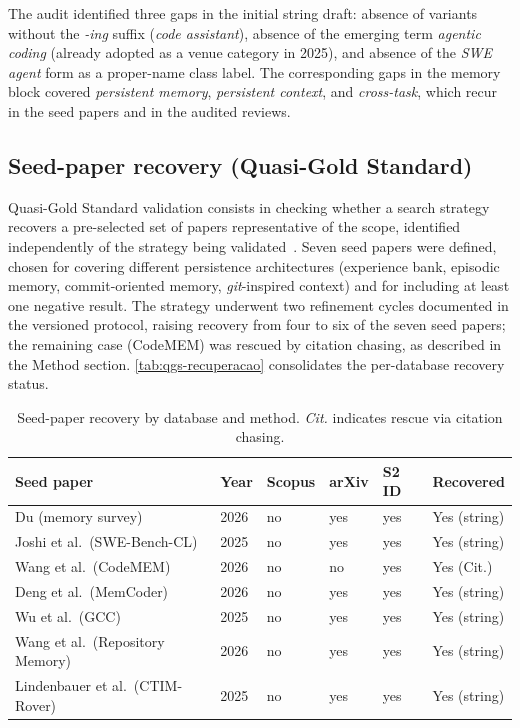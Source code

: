 The audit identified three gaps in the initial string draft: absence of variants without the
\textit{-ing} suffix (\textit{code assistant}), absence of the emerging term \textit{agentic
coding} (already adopted as a venue category in 2025), and absence of the \textit{SWE agent}
form as a proper-name class label.
The corresponding gaps in the memory block covered \textit{persistent memory},
\textit{persistent context}, and \textit{cross-task}, which recur in the seed papers and in
the audited reviews.

\subsection{Seed-paper recovery (Quasi-Gold Standard)}
\label{ap:qgs}

Quasi-Gold Standard validation consists in checking whether a search strategy recovers a
pre-selected set of papers representative of the scope, identified independently of the
strategy being validated~\citep{mourao2020hybrid}.
Seven seed papers were defined, chosen for covering different persistence architectures
(experience bank, episodic memory, commit-oriented memory, \textit{git}-inspired context)
and for including at least one negative result.
The strategy underwent two refinement cycles documented in the versioned protocol, raising
recovery from four to six of the seven seed papers; the remaining case (CodeMEM) was
rescued by citation chasing, as described in the Method section.
\autoref{tab:qgs-recuperacao} consolidates the per-database recovery status.

\begin{table}[htbp]
\centering
\caption{Seed-paper recovery by database and method. \textit{Cit.} indicates rescue via
citation chasing.}
\label{tab:qgs-recuperacao}
\small
\begin{tabular}{p{3.5cm}p{1cm}p{1.5cm}p{1.2cm}p{1.5cm}p{2cm}}
\toprule
\textbf{Seed paper} & \textbf{Year} & \textbf{Scopus} & \textbf{arXiv} & \textbf{S2 ID} & \textbf{Recovered} \\
\midrule
Du (memory survey)~\citep{du2026memory} & 2026 & no & yes & yes & Yes (string) \\
Joshi et al.\ (SWE-Bench-CL)~\citep{joshi2025swebenchcl} & 2025 & no & yes & yes & Yes (string) \\
Wang et al.\ (CodeMEM)~\citep{wang2026codemem} & 2026 & no & no & yes & Yes (Cit.) \\
Deng et al.\ (MemCoder)~\citep{deng2026memcoder} & 2026 & no & yes & yes & Yes (string) \\
Wu et al.\ (GCC)~\citep{wu2025gcc} & 2025 & no & yes & yes & Yes (string) \\
Wang et al.\ (Repository Memory)~\citep{wang2026improving} & 2026 & no & yes & yes & Yes (string) \\
Lindenbauer et al.\ (CTIM-Rover)~\citep{lindenbauer2025ctimrover} & 2025 & no & yes & yes & Yes (string) \\
\bottomrule
\end{tabular}
\end{table}

